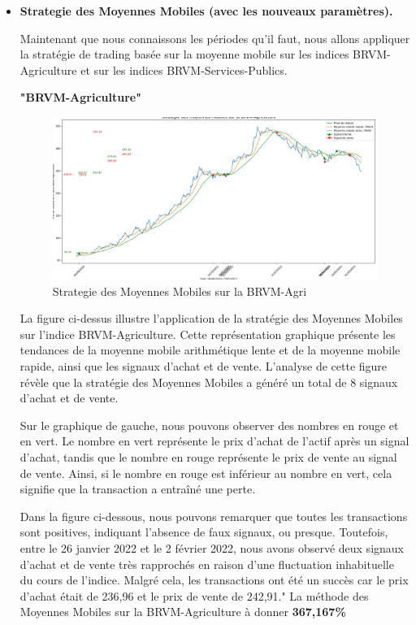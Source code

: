 \begin{itemize}
\newpage

\item[\ding{226}] \textbf{Strategie des Moyennes Mobiles (avec les nouveaux paramètres).}

\par{Maintenant que nous connaissons les périodes qu'il faut, nous allons appliquer la stratégie de 
trading basée sur la moyenne mobile sur les indices BRVM-Agriculture et sur les indices BRVM-Services-Publics.}

\begin{center}  \textbf{"BRVM-Agriculture"}  \end{center}
    \begin{figure}[h]
        \centering
        \includegraphics[width=1 \textwidth ]{img/MA-agri.jpg}
        \caption{Strategie des Moyennes Mobiles sur la BRVM-Agri}
        \label{fig:Strategie des Moyennes Mobiles sur la BRVM-Agri}
    \end{figure}
    \par{La figure ci-dessus illustre l'application de la stratégie des Moyennes Mobiles sur 
    l'indice BRVM-Agriculture. Cette représentation graphique présente les tendances de la 
    moyenne mobile arithmétique lente et de la moyenne mobile rapide, ainsi que les signaux 
    d'achat et de vente. L'analyse de cette figure révèle que la stratégie des Moyennes Mobiles 
    a généré un total de 8 signaux d'achat et de vente.

    Sur le graphique de gauche, nous pouvons observer des nombres en rouge et en vert. Le nombre 
    en vert représente le prix d'achat de l'actif après un signal d'achat, tandis que le nombre 
    en rouge représente le prix de vente au signal de vente. Ainsi, si le nombre en rouge est 
    inférieur au nombre en vert, cela signifie que la transaction a entraîné une perte.
    
    Dans la figure ci-dessous, nous pouvons remarquer que toutes les transactions sont positives,
     indiquant l'absence de faux signaux, ou presque. Toutefois, entre le 26 janvier 2022 et le 2 
     février 2022, nous avons observé deux signaux d'achat et de vente très rapprochés en raison 
     d'une fluctuation inhabituelle du cours de l'indice. Malgré cela, les transactions ont été un 
     succès car le prix d'achat était de 236,96 et le prix de vente de 242,91."
    La méthode des Moyennes Mobiles sur la BRVM-Agriculture à donner \textbf{367,167\%}}
    




\end{itemize}
